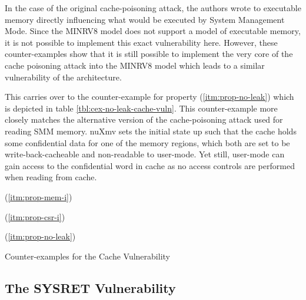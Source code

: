 In the case of the original cache-poisoning attack, the authors wrote to executable memory directly influencing what would be executed by System Management Mode.
Since the MINRV8 model does not support a model of executable memory, it is not possible to implement this exact vulnerability here.
However, these counter-examples show that it is still possible to implement the very core of the cache poisoning attack into the MINRV8 model which leads to a similar vulnerability of the architecture.

This carries over to the counter-example for property  (\ref{itm:prop-no-leak}) which is depicted in table \ref{tbl:cex-no-leak-cache-vuln}.
This counter-example more closely matches the alternative version of the cache-poisoning attack used for reading SMM memory.
nuXmv sets the initial state up such that the cache holds some confidential data for one of the memory regions, which both are set to be write-back-cacheable and non-readable to user-mode.
Yet still, user-mode can gain access to the confidential word in cache as no access controls are performed when reading from cache.

\begin{table}
    \begin{subtable}{\textwidth}
        \centering
        
        \caption{ (\ref{itm:prop-mem-i})}
        \label{tbl:cex-mem-i-cache-vuln}
    \end{subtable}

    \begin{subtable}{\textwidth}
        \centering
        
        \caption{ (\ref{itm:prop-csr-i})}
        \label{tbl:cex-csr-i-cache-vuln}
    \end{subtable}

    \begin{subtable}{\textwidth}
        \centering
        
        \caption{ (\ref{itm:prop-no-leak})}
        \label{tbl:cex-no-leak-cache-vuln}
    \end{subtable}
    \caption{Counter-examples for the Cache Vulnerability}
    \label{tbl:cex-cache-vuln}
\end{table}

\subsection{The SYSRET Vulnerability}
\label{sec:cexs-sysret}

